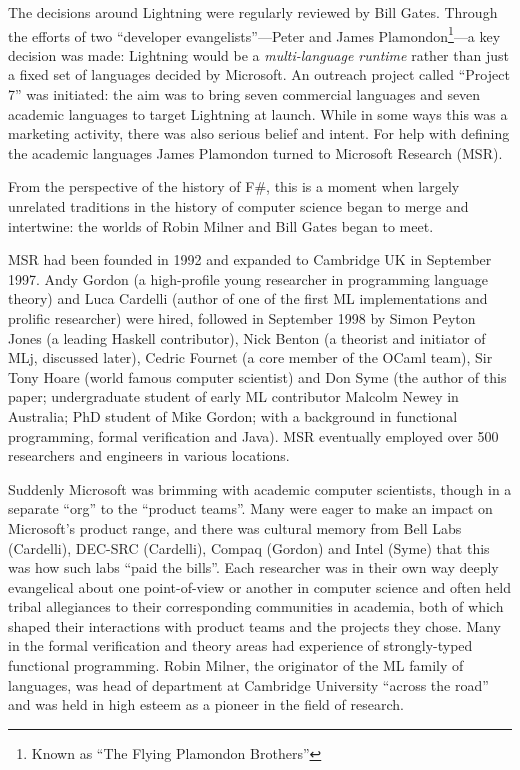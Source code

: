 \documentclass[acmsmall]{acmart}\settopmatter{}
\begin{document}
The decisions around Lightning were regularly reviewed by Bill Gates. Through the efforts of two “developer evangelists”---Peter
and James Plamondon\footnote{Known as “The Flying Plamondon Brothers”}---a key decision was made: Lightning would
be a \emph{multi-language runtime} rather than just a fixed set of languages decided by Microsoft.  An outreach
project called “Project 7” was initiated: the aim was to bring seven commercial languages and seven academic languages to
target Lightning at launch. While in some ways this was a marketing activity, there was also serious belief and intent.  For
help with defining the academic languages James Plamondon turned to Microsoft Research (MSR).

From the perspective of the history of F\#, this is a moment when largely unrelated traditions in the history of computer science began to merge and intertwine: the worlds of Robin Milner and Bill Gates began to meet.

MSR had been founded in 1992 and expanded to Cambridge UK in September 1997. Andy Gordon (a high-profile young researcher in
programming language theory) and Luca Cardelli (author of one of the first ML implementations and prolific researcher) were hired, followed
in September 1998 by Simon Peyton Jones (a leading Haskell contributor), Nick Benton (a theorist and initiator of MLj, discussed later), Cedric
Fournet (a core member of the OCaml team), Sir Tony Hoare (world famous computer scientist) and Don Syme (the author of this paper; undergraduate
student of early ML contributor Malcolm Newey in Australia; PhD student of Mike Gordon; with a background in functional programming, formal
verification and Java). MSR eventually employed over 500 researchers and engineers in various locations.  

Suddenly Microsoft was brimming with academic computer scientists, though in a separate “org” to the “product teams”.  Many were eager
to make an impact on Microsoft’s product range, and there was cultural memory from Bell Labs (Cardelli), DEC-SRC (Cardelli), Compaq (Gordon) and
Intel (Syme) that this was how such labs “paid the bills”.  Each researcher was in their own way deeply evangelical about one point-of-view or
another in computer science and often held tribal allegiances to their corresponding communities in academia, both of which shaped their
interactions with product teams and the projects they chose. Many in the formal verification and theory areas had experience of strongly-typed
functional programming. Robin Milner, the originator of the ML family of languages, was head of department at Cambridge University “across the road” and
was held in high esteem as a pioneer in the field of research. 
\end{document}
